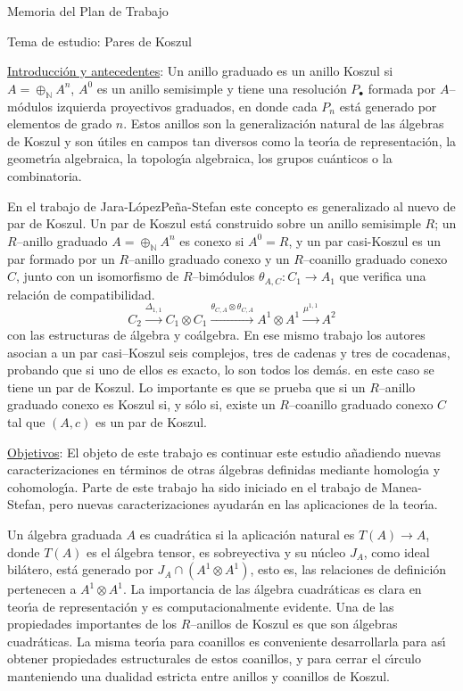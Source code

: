 \documentclass[a4paper,12pt]{article}
\begin{document}
{\LARGE Memoria del Plan de Trabajo}
\medskip

{\Large Tema de estudio: Pares de Koszul}

\medskip

\underline{Introducci\'{o}n y antecedentes}:
Un anillo graduado es un anillo Koszul si $A=\oplus_\mathbb{N}A^n$, $A^0$ es un anillo semisimple y tiene una resoluci\'{o}n $P_\bullet$ formada por 
$A$--m\'{o}dulos izquierda proyectivos graduados, en donde cada $P_n$ est\'{a} generado por elementos de grado $n$. Estos anillos son la generalizaci\'{o}n 
natural de las \'{a}lgebras de Koszul y son \'{u}tiles en campos tan diversos como la teor\'{\i}a de representaci\'{o}n, la geometr\'{\i}a algebraica, 
la topolog\'{\i}a algebraica, los grupos cu\'{a}nticos o la combinatoria.

En el trabajo de Jara-L\'{o}pezPe\~{n}a-Stefan este concepto es generalizado al nuevo de par de Koszul. Un par de Koszul est\'{a} construido sobre un anillo 
semisimple $R$; un $R$--anillo graduado $A=\oplus_\mathbb{N}A^n$ es conexo si $A^0=R$, y un par casi-Koszul es un par formado por un $R$--anillo graduado 
conexo y un $R$--coanillo graduado conexo $C$, junto con un isomorfismo de $R$--bim\'{o}dulos $\theta_{A,C}:C_1\longrightarrow{A_1}$ que verifica una relaci\'{o}n de compatibilidad.
\[
C_2\stackrel{\Delta_{1,1}}{\longrightarrow}C_1\otimes{C_1}
\stackrel{\theta_{C,A}\otimes\theta_{C,A}}{\longrightarrow}A^1\otimes{A^1}
\stackrel{\mu^{1,1}}{\longrightarrow}A^2
\]
con las estructuras de \'{a}lgebra y co\'{a}lgebra. En ese mismo trabajo los autores asocian a un par casi--Koszul seis complejos, tres de cadenas y tres de cocadenas, 
probando que si uno de ellos es exacto, lo son todos los dem\'{a}s. en este caso se tiene un par de Koszul. Lo importante es que se prueba que si un $R$--anillo graduado
conexo es Koszul si, y s\'{o}lo si, existe un $R$--coanillo graduado conexo $C$ tal que $(A,c)$ es un par de Koszul.

\medskip

\underline{Objetivos}:
El objeto de este trabajo es continuar este estudio a\~{n}adiendo nuevas caracterizaciones en t\'{e}rminos de otras \'{a}lgebras definidas mediante homolog\'{\i}a y cohomolog\'{\i}a. Parte de este trabajo ha sido iniciado en el trabajo de Manea-Stefan, pero nuevas caracterizaciones ayudar\'{a}n en las aplicaciones de la teor\'{\i}a.

Un \'{a}lgebra graduada $A$ es cuadr\'{a}tica si la aplicaci\'{o}n natural es $T(A)\longrightarrow{A}$, donde $T(A)$ es el \'{a}lgebra tensor, es sobreyectiva y su n\'{u}cleo $J_A$, como ideal bil\'{a}tero, est\'{a} generado por $J_A\cap(A^1\otimes{A^1})$, esto es, las relaciones de definici\'{o}n pertenecen a $A^1\otimes{A^1}$. La importancia de las \'{a}lgebra cuadr\'{a}ticas es clara en teor\'{\i}a de representaci\'{o}n y es computacionalmente evidente. Una de las propiedades importantes de los $R$--anillos de Koszul es que son \'{a}lgebras cuadr\'{a}ticas. La misma teor\'{\i}a para coanillos es conveniente desarrollarla para as\'{\i} obtener propiedades estructurales de estos coanillos, y para cerrar el c\'{\i}rculo manteniendo una dualidad estricta entre anillos y coanillos de Koszul.
\end{document}
